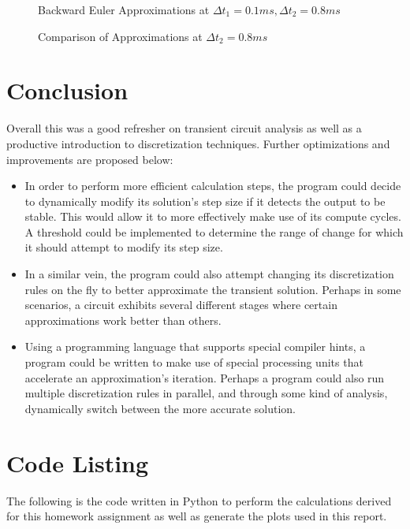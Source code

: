 \documentclass[10pt, oneside, letterpaper]{article}
\begin{document}
\begin{figure}[H]
    \begin{center}
        
    \end{center}
    \caption{Backward Euler Approximations at $\Delta{}t_1 = 0.1 ms, \Delta{}t_2 = 0.8 ms$}
    \label{back_approx}
\end{figure}

\begin{figure}[H]
    \begin{center}
        
    \end{center}
    \caption{Comparison of Approximations at $\Delta{}t_2 = 0.8 ms$}
    \label{approx_comp}
\end{figure}
\section{Conclusion}
Overall this was a good refresher on transient circuit analysis as well as a productive introduction to discretization techniques. Further optimizations and improvements are proposed below:
\begin{itemize}
    \item In order to perform more efficient calculation steps, the program could decide to dynamically modify its solution's step size if it detects the output to be stable. This would allow it to more effectively make use of its compute cycles. A threshold could be implemented to determine the range of change for which it should attempt to modify its step size.
    \item In a similar vein, the program could also attempt changing its discretization rules on the fly to better approximate the transient solution. Perhaps in some scenarios, a circuit exhibits several different stages where certain approximations work better than others.
    \item Using a programming language that supports special compiler hints, a program could be written to make use of special processing units that accelerate an approximation's iteration. Perhaps a program could also run multiple discretization rules in parallel, and through some kind of analysis, dynamically switch between the more accurate solution. 
\end{itemize}
\newpage
\section{Code Listing}
The following is the code written in Python to perform the calculations derived for this homework assignment as well as generate the plots used in this report.

	
\end{document}
